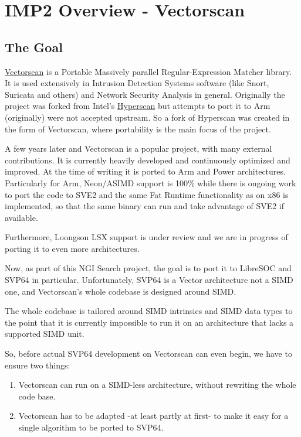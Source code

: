 %
\section{IMP2 Overview - Vectorscan}

\subsection{The Goal}

\href{https://github.com/VectorCamp/vectorscan}{Vectorscan} is a Portable Massively parallel Regular-Expression Matcher library. It is used extensively in Intrusion Detection Systems software (like Snort, Suricata and others) and Network Security Analysis in general.
Originally the project was forked from Intel's \href{https://github.com/intel/hyperscan}{Hyperscan} but attempts to port it to Arm (originally) were not accepted upstream. So a fork of Hyperscan was created in the form of Vectorscan, where portability is the main focus of the project.

A few years later and Vectorscan is a popular project, with many external contributions. It is currently heavily developed and continuously optimized and improved. 
At the time of writing it is ported to Arm and Power architectures. Particularly for Arm, Neon/ASIMD support is 100\% while there is ongoing work to port the code to SVE2 and the same Fat Runtime functionality as on x86 is implemented, so that the same binary can run and take advantage of SVE2 if available. 

Furthermore, Loongson LSX support is under review and we are in progress of porting it to even more architectures. 

Now, as part of this NGI Search project, the goal is to port it to LibreSOC and SVP64 in particular. Unfortunately, SVP64 is a Vector architecture not a SIMD one, and Vectorscan's whole codebase is designed around SIMD.

The whole codebase is tailored around SIMD intrinsics and SIMD data types to the point that it is currently impossible to run it on an architecture that lacks a supported SIMD unit.

So, before actual SVP64 development on Vectorscan can even begin, we have to ensure two things:

\begin{enumerate}
  \item Vectorscan can run on a SIMD-less architecture, without rewriting the whole code base.
  \item Vectorscan has to be adapted -at least partly at first- to make it easy for a single algorithm to be ported to SVP64.
\end{enumerate}

